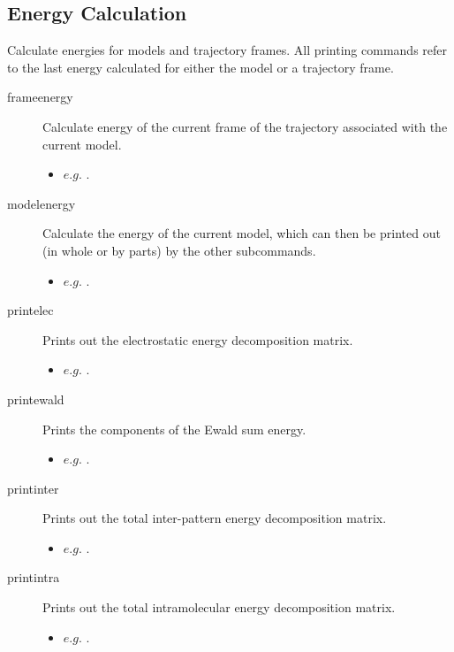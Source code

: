 \subsection{Energy Calculation}
Calculate energies for models and trajectory frames. All printing commands refer to the last energy calculated for either the model or a trajectory frame.\\
\begin{description}

	\item[frameenergy\its] Calculate energy of the current frame of the trajectory associated with the current model.
	\begin{itemize}
		\item $e.g.$ .
	\end{itemize}

	\item[modelenergy\its] Calculate the energy of the current model, which can then be printed out (in whole or by parts) by the other subcommands.
	\begin{itemize}
		\item $e.g.$ .
	\end{itemize}

	\item[printelec\its] Prints out the electrostatic energy decomposition matrix.
	\begin{itemize}
		\item $e.g.$ .
	\end{itemize}

	\item[printewald\its] Prints the components of the Ewald sum energy.
	\begin{itemize}
		\item $e.g.$ .
	\end{itemize}

	\item[printinter\its] Prints out the total inter-pattern energy decomposition matrix.
	\begin{itemize}
		\item $e.g.$ .
	\end{itemize}

	\item[printintra\its] Prints out the total intramolecular energy decomposition matrix.
	\begin{itemize}
		\item $e.g.$ .
	\end{itemize}


\end{description}
